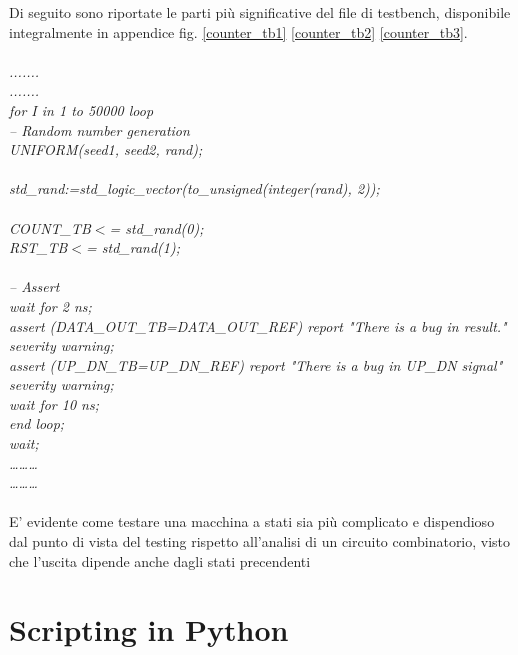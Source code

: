 Di seguito sono riportate le parti più significative del file di testbench, disponibile integralmente in appendice fig. \ref{counter_tb1} \ref{counter_tb2} \ref{counter_tb3}.\\
\\
\textit{.......\\
.......\\
for I in 1 to 50000 loop\\
-- Random number generation\\
UNIFORM(seed1, seed2, rand);\\
\\
std\_rand:=std\_logic\_vector(to\_unsigned(integer(rand), 2));\\
\\
COUNT\_TB$<$= std\_rand(0);\\
RST\_TB$<$= std\_rand(1); \\
\\
-- Assert\\
wait for 2 ns;\\
assert (DATA\_OUT\_TB=DATA\_OUT\_REF) report "There is a bug in result." severity warning;\\
assert (UP\_DN\_TB=UP\_DN\_REF) report "There is a bug in UP\_DN signal" severity warning;\\
wait for 10 ns;\\
end loop;\\
wait;\\
………\\
………}\\
\\
E' evidente come testare una macchina a stati sia più complicato e dispendioso dal punto di vista del testing rispetto all'analisi di un circuito combinatorio, visto che l'uscita dipende anche dagli stati precendenti\\ 
\section{Scripting in Python}

